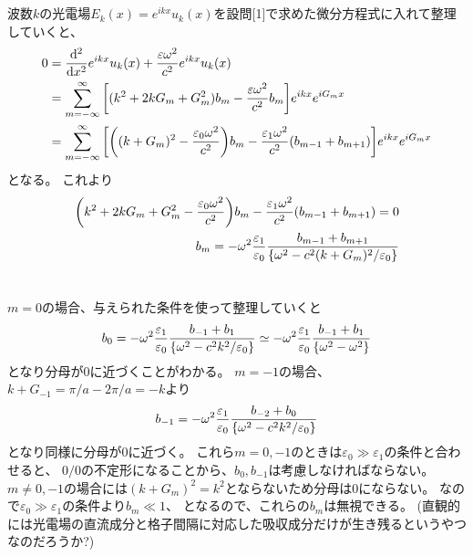 \documentclass[../../master.tex]{subfiles}
\begin{document}
\section{}
波数\(k\)の光電場\(E_k(x)=e^{ikx}u_k(x)\)を設問[1]で求めた微分方程式に入れて整理していくと、
\begin{equation}\begin{aligned}[b]
    0&=\dv[2]{x}e^{ikx}u_k(x)+\frac{\varepsilon \omega^2}{c^2}e^{ikx}u_k(x)\\
    &=\sum_{m=-\infty}^{\infty}\qty[(k^2+2kG_m+G_m^2)b_m-\frac{\varepsilon\omega^2}{c^2}b_m]e^{ikx}e^{iG_mx}\\
    &=\sum_{m=-\infty}^{\infty}\qty[
        \qty((k+G_m)^2-\frac{\varepsilon_0\omega^2}{c^2})b_m
        -\frac{\varepsilon_1\omega^2}{c^2}(b_{m-1}+b_{m+1})]e^{ikx}e^{iG_mx}
\end{aligned}\end{equation}
となる。
これより
\begin{equation}\begin{aligned}[b]
    \qty(k^2+2kG_m+G_m^2-\frac{\varepsilon_0\omega^2}{c^2})b_m
        -\frac{\varepsilon_1\omega^2}{c^2}(b_{m-1}+b_{m+1}) =0\\
        b_m = -\omega^2\frac{\varepsilon_1}{\varepsilon_0}\frac{b_{m-1}+b_{m+1}}{\qty{\omega^2-c^2(k+G_m)^2/\varepsilon_0}}
\end{aligned}\end{equation}

\section{}
\(m=0\)の場合、与えられた条件を使って整理していくと
\begin{equation}\begin{aligned}[b]
    b_0 = -\omega^2\frac{\varepsilon_1}{\varepsilon_0}\frac{b_{-1}+b_{1}}{\qty{\omega^2-c^2k^2/\varepsilon_0}}
    \simeq -\omega^2\frac{\varepsilon_1}{\varepsilon_0}\frac{b_{-1}+b_{1}}{\qty{\omega^2-\omega^2}}
\end{aligned}\end{equation}
となり分母が0に近づくことがわかる。
\(m=-1\)の場合、\(k+G_{-1}=\pi/a-2\pi/a = -k\)より
\begin{equation}\begin{aligned}[b]
    b_{-1} = -\omega^2\frac{\varepsilon_1}{\varepsilon_0}\frac{b_{-2}+b_{0}}{\qty{\omega^2-c^2k^2/\varepsilon_0}}
\end{aligned}\end{equation}
となり同様に分母が0に近づく。
これら\(m=0,-1\)のときは\(\varepsilon_0\gg\varepsilon_1\)の条件と合わせると、
\(0/0\)の不定形になることから、\(b_0,b_{-1}\)は考慮しなければならない。
\(m\neq 0,-1\)の場合には\((k+G_m)^2 = k^2\)とならないため分母は0にならない。
なので\(\varepsilon_0\gg\varepsilon_1\)の条件より\(b_m\ll 1\)、
となるので、これらの\(b_m\)は無視できる。
(直観的には光電場の直流成分と格子間隔に対応した吸収成分だけが生き残るというやつなのだろうか?)
\end{document}

